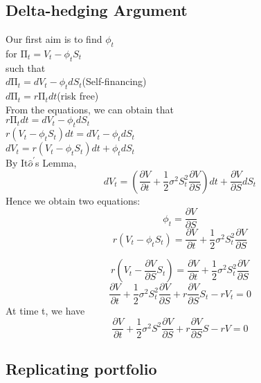 \subsection{Delta-hedging Argument}

\begin{center}
Our first aim is to find $\phi_{t}$\\[1mm]
for $\mathrm{\Pi}_{t} = V_{t} - \phi_{t}S_{t}$\\[3mm]
such that\\[1mm]
$d\mathrm{\Pi}_{t} = dV_{t} - \phi_{t}dS_{t}$(Self-financing)\\[1mm]
$d\mathrm{\Pi}_{t} = r\mathrm{\Pi}_{t}dt$(risk free)\\[3mm]
From the equations, we can obtain that\\[1mm]
$r\mathrm{\Pi}_{t}dt = dV_{t} - \phi_{t}dS_{t}$\\[1mm]
$r(V_{t} - \phi_{t}S_{t})dt = dV_{t} - \phi_{t}dS_{t}$\\[1mm]
$dV_{t}  = r(V_{t} - \phi_{t}S_{t})dt + \phi_{t}dS_{t}$\\[1mm]
By It$\hat{o}^{\prime}$s Lemma, $$dV_{t} = (\frac{\partial V}{\partial t}+\frac{1}{2}\sigma^{2}S_{t}^{2}\frac{\partial V}{\partial S})dt + \frac{\partial V}{\partial S}dS_{t}$$
Hence we obtain two equations:
$$\phi_{t} = \frac{\partial V}{\partial S}$$
$$r(V_{t} - \phi_{t}S_{t}) = \frac{\partial V}{\partial t}+\frac{1}{2}\sigma^{2}S_{t}^{2}\frac{\partial V}{\partial S}$$
\end{center}

\begin{center}
$$r(V_{t} - \frac{\partial V}{\partial S}S_{t}) = \frac{\partial V}{\partial t}+\frac{1}{2}\sigma^{2}S_{t}^{2}\frac{\partial V}{\partial S}$$
$$\frac{\partial V}{\partial t}+\frac{1}{2}\sigma^{2}S_{t}^{2}\frac{\partial V}{\partial S} + r\frac{\partial V}{\partial S}S_{t} - rV_{t} = 0$$
At time t, we have
$$\frac{\partial V}{\partial t}+\frac{1}{2}\sigma^{2}S^{2}\frac{\partial V}{\partial S} + r\frac{\partial V}{\partial S}S - rV = 0$$
\end{center}
\newpage

\subsection{Replicating portfolio}

